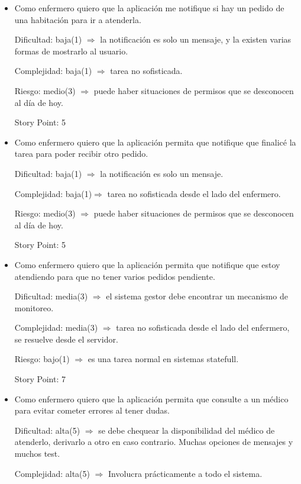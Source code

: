 \documentclass[
11pt, %
]{charter}
\begin{document}
\begin{itemize}
\item Como enfermero quiero que la aplicación me notifique si hay un pedido de una habitación para ir a atenderla.

Dificultad: baja(1) $\Rightarrow$ la notificación es solo un mensaje, y la existen varias formas de mostrarlo al usuario.

Complejidad: baja(1) $\Rightarrow$ tarea no sofisticada.

Riesgo: medio(3) $\Rightarrow$ puede haber situaciones de permisos que se desconocen al día de hoy.

Story Point: 5

\item Como enfermero quiero que la aplicación permita que notifique que finalicé la tarea para poder recibir otro pedido.

Dificultad: baja(1) $\Rightarrow$ la notificación es solo un mensaje.

Complejidad: baja(1)$\Rightarrow$ tarea no sofisticada desde el lado del enfermero.

Riesgo: medio(3) $\Rightarrow$ puede haber situaciones de permisos que se desconocen al día de hoy.

Story Point: 5

\item Como enfermero quiero que la aplicación permita que notifique que estoy atendiendo para que no tener varios pedidos pendiente.

Dificultad: media(3) $\Rightarrow$ el sistema gestor debe encontrar un mecanismo de monitoreo.

Complejidad: media(3) $\Rightarrow$ tarea no sofisticada desde el lado del enfermero, se resuelve desde el servidor.

Riesgo: bajo(1) $\Rightarrow$ es una tarea normal en sistemas statefull.

Story Point: 7

\item Como enfermero quiero que la aplicación permita que consulte a un médico para evitar cometer errores al tener dudas.

Dificultad: alta(5) $\Rightarrow$ se debe chequear la disponibilidad del médico de atenderlo, derivarlo a otro en caso contrario. Muchas opciones de mensajes y muchos test.

Complejidad: alta(5) $\Rightarrow$ Involucra prácticamente a todo el sistema.


\end{itemize}
\end{document}
